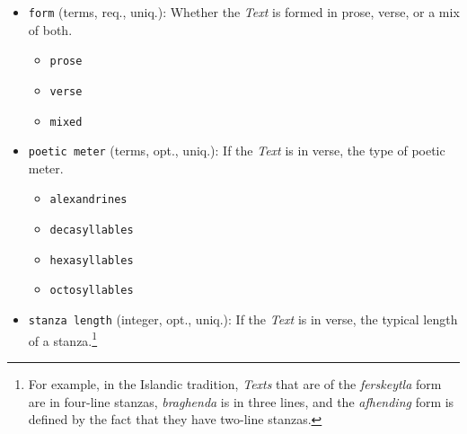 \begin{itemize}
\begin{multicols}{2}
\begin{itemize}
            \item \texttt{oco}: Old Cornish
            \item \texttt{odt}: Old Dutch
            \item \texttt{owl}: Old Welsh
            \item \texttt{por}: Portugese
            \item \texttt{pro}: Old Occitan, Old Provençal (to 1500)
            \item \texttt{spa}: Spanish or Castilian
            \item \texttt{sga}: Old Irish (to 900)
            \item \texttt{wlm}: Middle Welsh
            \item \texttt{xno}: Anglo-Norman
        \end{itemize}
    \end{multicols}
    \item \texttt{form} (terms, req., uniq.): Whether the \textit{Text} is formed in prose, verse, or a mix of both.
    \begin{multicols}{4}
        \begin{itemize}
            \item \texttt{prose}
            \item \texttt{verse}
            \item \texttt{mixed}
        \end{itemize}
    \end{multicols}
    \item \texttt{poetic meter} (terms, opt., uniq.): If the \textit{Text} is in verse, the type of poetic meter.
    \begin{multicols}{4}
        \begin{itemize}
            \item \texttt{alexandrines}
            \item \texttt{decasyllables}
            \item \texttt{hexasyllables}
            \item \texttt{octosyllables}
        \end{itemize}
    \end{multicols}
    \item \texttt{stanza length} (integer, opt., uniq.): If the \textit{Text} is in verse, the typical length of a stanza.\footnote{For example, in the Islandic tradition, \textit{Texts} that are of the \textit{ferskeytla} form are in four-line stanzas, \textit{braghenda} is in three lines, and the \textit{afhending} form is defined by the fact that they have two-line stanzas.}

\end{itemize}
